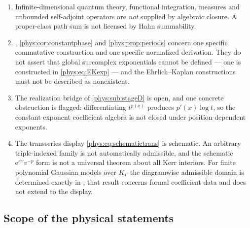 \documentclass[11pt,letterpaper]{article}
\numberwithin{equation}{section}
\theoremstyle{definition}
\theoremstyle{remark}
\newcommand{\ee}{\mathrm e}
\begin{document}
\begin{enumerate}[label=\textup{N\arabic*.},leftmargin=3.0em,start=11]
\item Infinite-dimensional quantum theory, functional integration, measures and
unbounded self-adjoint operators are \emph{not} supplied by algebraic closure.
A proper-class path sum is not licensed by Hahn summability.
\item {}, \cref{phys:cor:constantphase} and
\cref{phys:prop:periods} concern one specific commutative construction and one
specific normalized derivation. They do not assert that global surcomplex
exponentials cannot be defined --- one is constructed in
\eqref{phys:eq:EKexp} --- and the Ehrlich--Kaplan constructions must not be
described as nonexistent.
\item The realization bridge of \cref{phys:sub:stageD} is open, and one
concrete obstruction is flagged: differentiating $t^{p(x)}$ produces
$p'(x)\log t$, so the constant-exponent coefficient algebra is not closed under
position-dependent exponents.
\item The transseries display \eqref{phys:eq:schematictrans} is schematic. An
arbitrary triple-indexed family is not automatically admissible, and the
schematic $\ee^{\kappa v}v^{-p}$ form is not a universal theorem about all
Kerr interiors. For finite polynomial Gaussian models over $K_\Gamma$ the
diagramwise admissible domain is determined exactly in
; that result concerns
formal coefficient data and does not extend to the display.
\end{enumerate}

\subsection{Scope of the physical statements}
\label{phys:app:sub:nc-physics}
\end{document}
